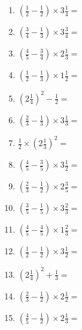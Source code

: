 \documentclass[12pt]{article}
\begin{document}
\begin{enumerate}
\item \large $ \left( \frac{1}{2} - \frac{1}{2} \right) \times 3 \frac{1}{4} = $ \vspace{1.6cm}
\item \large $ \left( \frac{3}{4} - \frac{1}{3} \right) \times 3 \frac{3}{4} = $ \vspace{1.6cm}
\item \large $ \left( \frac{4}{5} - \frac{3}{4} \right) \times 2 \frac{1}{3} = $ \vspace{1.6cm}
\item \large $ \left( \frac{1}{2} - \frac{1}{3} \right) \times 1 \frac{1}{2} = $ \vspace{1.6cm}
\item \large $ \left( 2 \frac{1}{4} \right)^2 - \frac{1}{2} = $ \vspace{1.6cm}
\newpage
\item \large $ \left( \frac{2}{3} - \frac{1}{3} \right) \times 3 \frac{1}{3} = $ \vspace{1.6cm}
\item \large $ \frac{1}{2} \times \left( 2 \frac{1}{3} \right)^2 = $ \vspace{1.6cm}
\item \large $ \left( \frac{4}{5} - \frac{3}{5} \right) \times 3 \frac{1}{2} = $ \vspace{1.6cm}
\item \large $ \left( \frac{2}{3} - \frac{1}{2} \right) \times 2 \frac{3}{5} = $ \vspace{1.6cm}
\item \large $ \left( \frac{3}{5} - \frac{1}{5} \right) \times 3 \frac{2}{3} = $ \vspace{1.6cm}
\item \large $ \left( \frac{4}{5} - \frac{4}{5} \right) \times 1 \frac{2}{3} = $ \vspace{1.6cm}
\item \large $ \left( \frac{1}{2} - \frac{1}{2} \right) \times 3 \frac{1}{2} = $ \vspace{1.6cm}
\item \large $ \left( 2 \frac{1}{4} \right)^2 + \frac{1}{3} = $ \vspace{1.6cm}
\item \large $ \left( \frac{2}{3} - \frac{1}{2} \right) \times 2 \frac{1}{2} = $ \vspace{1.6cm}
\item \large $ \left( \frac{4}{5} - \frac{1}{2} \right) \times 2 \frac{1}{3} = $ \vspace{1.6cm}

\end{enumerate}
\end{document}
